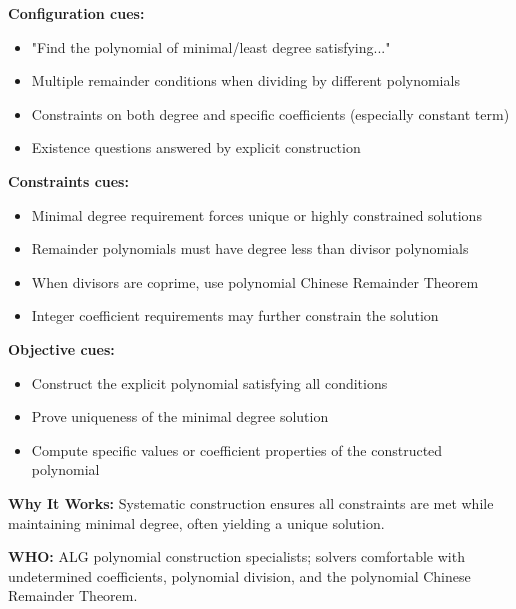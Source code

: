 \documentclass[12pt]{article}
\begin{document}
\textbf{Configuration cues:}
\begin{itemize}
    \item "Find the polynomial of minimal/least degree satisfying..."
    \item Multiple remainder conditions when dividing by different polynomials
    \item Constraints on both degree and specific coefficients (especially constant term)
    \item Existence questions answered by explicit construction
\end{itemize}

\textbf{Constraints cues:}
\begin{itemize}
    \item Minimal degree requirement forces unique or highly constrained solutions
    \item Remainder polynomials must have degree less than divisor polynomials
    \item When divisors are coprime, use polynomial Chinese Remainder Theorem
    \item Integer coefficient requirements may further constrain the solution
\end{itemize}

\textbf{Objective cues:}
\begin{itemize}
    \item Construct the explicit polynomial satisfying all conditions
    \item Prove uniqueness of the minimal degree solution
    \item Compute specific values or coefficient properties of the constructed polynomial
\end{itemize}

\textbf{Why It Works:} Systematic construction ensures all constraints are met while maintaining minimal degree, often yielding a unique solution.

\textbf{WHO:} ALG polynomial construction specialists; solvers comfortable with undetermined coefficients, polynomial division, and the polynomial Chinese Remainder Theorem.
\end{document}
